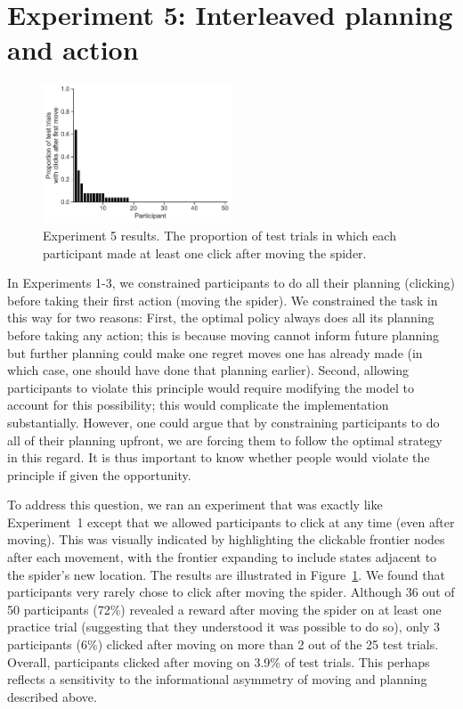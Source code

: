 \section{Experiment 5: Interleaved planning and action}\label{app:planning-experiment5}


\begin{figure}[h!]
    \centering
    \includegraphics[width=0.5\textwidth]{figs/planning/interleaved.pdf}
    \caption{Experiment 5 results. The proportion of test trials in which each participant made at least one click after moving the spider.}
    \label{fig:exp5}
\end{figure}


In Experiments 1-3, we constrained participants to do all their planning (clicking) before taking their first action (moving the spider). We constrained the task in this way for two reasons: First, the optimal policy always does all its planning before taking any action; this is because moving cannot inform future planning but further planning could make one regret moves one has already made (in which case, one should have done that planning earlier). Second, allowing participants to violate this principle would require modifying the model to account for this possibility; this would complicate the implementation substantially. However, one could argue that by constraining participants to do all of their planning upfront, we are forcing them to follow the optimal strategy in this regard. It is thus important to know whether people would violate the principle if given the opportunity.

To address this question, we ran an experiment that was exactly like Experiment~1 except that we allowed participants to click at any time (even after moving). This was visually indicated by highlighting the clickable frontier nodes after each movement, with the frontier expanding to include states adjacent to the spider's new location. The results are illustrated in Figure~\ref{fig:exp5}. We found that participants very rarely chose to click after moving the spider. Although 36 out of 50 participants (72\%) revealed a reward after moving the spider on at least one practice trial (suggesting that they understood it was possible to do so), only 3 participants (6\%) clicked after moving on more than 2 out of the 25 test trials. Overall, participants clicked after moving on 3.9\% of test trials. This perhaps reflects a sensitivity to the informational asymmetry of moving and planning described above.


